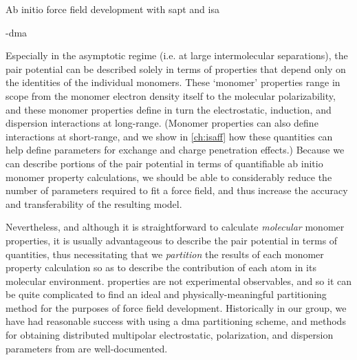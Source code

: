 \begin{section}{Ab initio force field development with \acrshort{sapt} and
\acrshort{isa}}
\begin{subsection}{\sapt}
\end{subsection}

\begin{subsection}{\isa-\acrshort{dma}}
\label{sec:intro-isa}

Especially in the asymptotic regime (i.e. at large
intermolecular separations), the pair potential can be described solely in
terms of properties that depend only on the identities of the individual monomers.
\cite{Stone2007,Metz2016}
These `monomer' properties range in scope from the monomer electron density
itself to the molecular polarizability, and these monomer properties define in
turn the electrostatic,
induction, and dispersion interactions at long-range. (Monomer properties can
also define interactions at short-range, and we
show in \cref{ch:isaff} how these quantities can help define parameters for exchange and
charge penetration effects.) Because we can
describe portions of the pair potential in terms of quantifiable ab initio monomer property
calculations, we should be able to considerably reduce the number of 
parameters required to fit a force field,
and thus increase the accuracy and transferability of the resulting model. 

Nevertheless, and although it is straightforward to calculate \emph{molecular} monomer
properties, it is usually advantageous\cite{Stone2007} to describe the pair
potential in terms of \emph{\aim} quantities, thus necessitating that we
\emph{partition} the results of each monomer property calculation so as to describe the
contribution of each atom in its molecular environment. \aim properties are
not experimental observables, and so it can be quite complicated to find an
ideal and physically-meaningful partitioning method for the purposes of force
field development.\cite{camcasp5.8,Misquitta2014,Stone2007,Pastorczak2017} 
Historically in our group, we have had reasonable success with using a 
\acrfull{dma} partitioning scheme, and methods for
obtaining distributed multipolar electrostatic,\cite{Stone1981,Stone2005}
polarization,\cite{Misquitta2006}
and
dispersion\cite{Williams2003,Misquitta2008,McDaniel2013}
parameters
from \dma are well-documented.\cite{McDaniel2014a,Stone2007}


\end{subsection}
\end{section}
